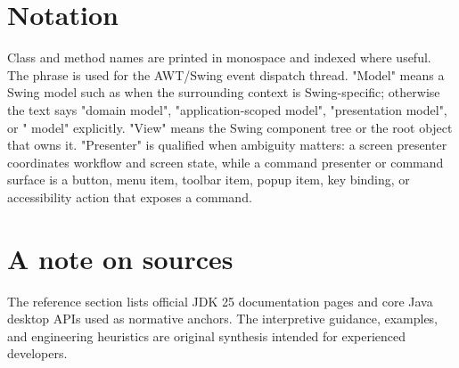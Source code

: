 \section*{Notation}

Class and method names are printed in monospace and indexed where useful. The phrase \edt{} is used for the AWT/Swing event dispatch thread. "Model" means a Swing model such as  when the surrounding context is Swing-specific; otherwise the text says "domain model", "application-scoped model", "presentation model", or "\corusco{} model" explicitly. "View" means the Swing component tree or the root object that owns it. "Presenter" is qualified when ambiguity matters: a screen presenter coordinates workflow and screen state, while a command presenter or command surface is a button, menu item, toolbar item, popup item, key binding, or accessibility action that exposes a command.

\section*{A note on sources}

The reference section lists official JDK 25 documentation pages and core Java desktop APIs used as normative anchors. The interpretive guidance, examples, and engineering heuristics are original synthesis intended for experienced developers.
